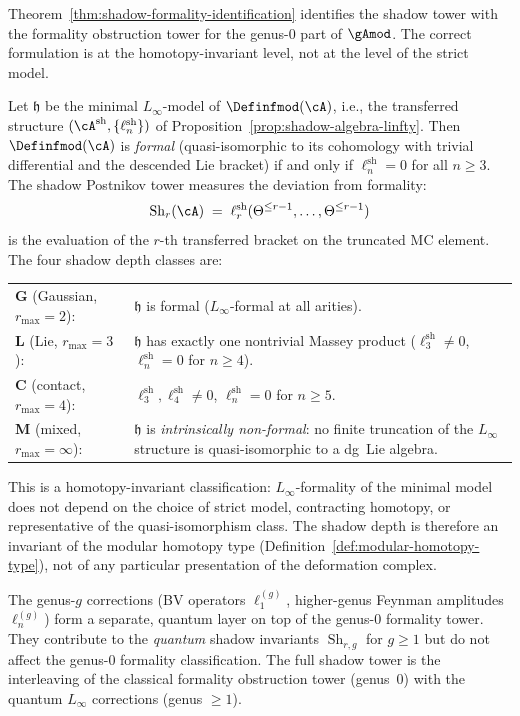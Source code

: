 \begin{remark}
\label{rem:shadow-tower-linfty-formality}
Theorem~\ref{thm:shadow-formality-identification} identifies
the shadow tower with the formality obstruction tower for
the genus-$0$ part of $\gAmod$.  The correct formulation
is at the homotopy-invariant level, not at the level of the
strict model.

Let $\mathfrak{h}$ be the minimal $L_\infty$-model
of $\Definfmod(\cA)$, i.e., the transferred structure
$(\cA^{\mathrm{sh}}, \{\ell_n^{\mathrm{sh}}\})$
of Proposition~\ref{prop:shadow-algebra-linfty}.
Then $\Definfmod(\cA)$ is \emph{formal} (quasi-isomorphic to
its cohomology with trivial differential and the descended
Lie bracket) if and only if $\ell_n^{\mathrm{sh}} = 0$ for all
$n \geq 3$.  The shadow Postnikov tower measures the
deviation from formality:
\[
\operatorname{Sh}_r(\cA)
\;=\;
\ell_r^{\mathrm{sh}}(\Theta^{\leq r-1}, \ldots,
\Theta^{\leq r-1})
\]
is the evaluation of the $r$-th transferred bracket on the
truncated MC element.  The four shadow depth classes are:
\begin{center}
\small
\begin{tabular}{ll}
\textbf{G} (Gaussian, $r_{\max} = 2$): &
  $\mathfrak{h}$ is formal ($L_\infty$-formal at all arities). \\
\textbf{L} (Lie, $r_{\max} = 3$): &
  $\mathfrak{h}$ has exactly one nontrivial Massey product
  ($\ell_3^{\mathrm{sh}} \neq 0$, $\ell_n^{\mathrm{sh}} = 0$
  for $n \geq 4$). \\
\textbf{C} (contact, $r_{\max} = 4$): &
  $\ell_3^{\mathrm{sh}}, \ell_4^{\mathrm{sh}} \neq 0$,
  $\ell_n^{\mathrm{sh}} = 0$ for $n \geq 5$. \\
\textbf{M} (mixed, $r_{\max} = \infty$): &
  $\mathfrak{h}$ is \emph{intrinsically non-formal}:
  no finite truncation of the $L_\infty$ structure is
  quasi-isomorphic to a dg~Lie algebra.
\end{tabular}
\end{center}
This is a homotopy-invariant classification:
$L_\infty$-formality of the minimal model does not depend on
the choice of strict model, contracting homotopy, or
representative of the quasi-isomorphism class.  The shadow
depth is therefore an invariant of the modular homotopy type
(Definition~\ref{def:modular-homotopy-type}), not of any
particular presentation of the deformation complex.

The genus-$g$ corrections (BV operators $\ell_1^{(g)}$,
higher-genus Feynman amplitudes $\ell_n^{(g)}$) form a
separate, quantum layer on top of the genus-$0$ formality
tower.  They contribute to the \emph{quantum} shadow
invariants $\operatorname{Sh}_{r,g}$ for $g \geq 1$ but do
not affect the genus-$0$ formality classification.
The full shadow tower is the interleaving of the classical
formality obstruction tower (genus~$0$) with the quantum
$L_\infty$ corrections (genus $\geq 1$).
\end{remark}

